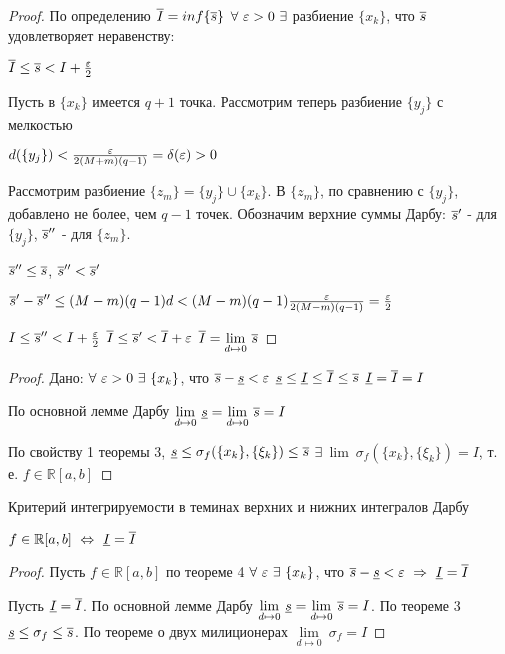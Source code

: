 \begin{proof}
По определению $\overline{I}=inf\{\overline{s}\}$ \then $\forall\ \varepsilon>0\ \exists$ разбиение $\{x_k\}$, что $\overline{s}$ удовлетворяет неравенству:

$\overline{I}\leq\overline{s}<I+\frac{\varepsilon}2$

Пусть в $\{x_k\}$ имеется $q+1$ точка. Рассмотрим теперь разбиение $\{y_j\}$ с мелкостью

$d(\{y_j\})<\frac{\varepsilon}{2(M+m)(q-1)}=\delta(\varepsilon)>0$

Рассмотрим разбиение $\{z_m\}=\{y_j\}\cup\{x_k\}$. В $\{z_m\}$, по сравнению с $\{y_j\}$, добавлено не более, чем $q-1$ точек. Обозначим верхние суммы Дарбу: $\overline{s}'$ - для $\{y_j\}$, $\overline{s}''$ - для $\{z_m\}$.

$\overline{s}''\leq\overline{s}$, $\overline{s}''<\overline{s}'$

$\overline{s}'-\overline{s}''\leq(M-m)(q-1)d<(M-m)(q-1)\frac{\varepsilon}{2(M-m)(q-1)}=\frac{\varepsilon}2$

$I\leq\overline{s}''<I+\frac{\varepsilon}2$ \then $\overline{I}\leq\overline{s}'<\overline{I}+\varepsilon$ \then $\overline{I}=\underset{d\mapsto0}{\lim}\ \overline{s}$
\end{proof}
\begin{proof}

Дано: $\forall\ \eps>0\ \exists\ \{x_k\}$, что $\overline{s}-\underline{s}<\varepsilon$ \then $\underline{s}\leq\underline{I}\leq\overline{I}\leq\overline{s}$ \then $\underline{I}=\overline{I}=I$

По основной лемме Дарбу $\underset{d\mapsto0}{\lim}\ \ns=\underset{d\mapsto0}{\lim}\ \vs=I$

По свойству 1 теоремы 3, $\underline{s}\leq\sigma_f(\{x_k\},\{\xi_k\})\leq\overline{s}$ \then $\exists\ \lim\ \sigma_f(\{x_k\},\{\xi_k\})=I$, т. е. $f\in\mathbb{R}[a,b]$
\end{proof}
\begin{theor}Критерий интегрируемости в теминах верхних и нижних интегралов Дарбу

$f\in\mathbb{R}[a,b]\ \Leftrightarrow\ \nis=\vis$
\end{theor}
\begin{proof}

Пусть $f\in\mathbb{R}[a,b]$ \then по теореме 4 $\forall\ \eps\ \exists\ \{x_k\}$, что $\vs-\ns<\eps\ \Rightarrow\ \nis=\vis$


Пусть $\underline{I}=\overline{I}$. По основной лемме Дарбу $\underset{d\mapsto0}{\lim}\ \ns=\underset{d\mapsto0}{\lim}\ \vs=I$. По теореме 3 $\underline{s}\leq\sigma_f\leq\overline{s}$. По теореме о двух милиционерах $\underset{d\mapsto0}{\lim}\ \sigma_f=I$
\end{proof}
